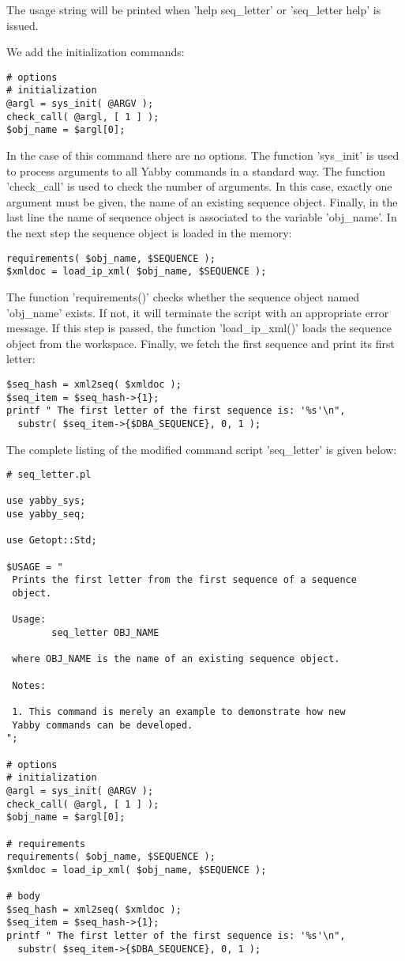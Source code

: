 The usage string will be printed when 'help seq\_letter' or
'seq\_letter help' is issued.

We add the initialization commands:

\begin{verbatim}
# options
# initialization
@argl = sys_init( @ARGV );
check_call( @argl, [ 1 ] );
$obj_name = $argl[0];
\end{verbatim}

In the case of this command there are no options. The function
'sys\_init' is used to process arguments to all Yabby commands
in a standard way. The function 'check\_call' is used to check
the number of arguments.  In this case, exactly one argument
must be given, the name of an existing sequence object.  Finally,
in the last line the name of sequence object is associated to
the variable 'obj\_name'. In the next step the sequence object
is loaded in the memory:
 
\begin{verbatim}
requirements( $obj_name, $SEQUENCE );
$xmldoc = load_ip_xml( $obj_name, $SEQUENCE );
\end{verbatim}

The function 'requirements()' checks whether the sequence object
named 'obj\_name' exists. If not, it will terminate the script
with an appropriate error message. If this step is passed, the
function 'load\_ip\_xml()' loads the sequence object from the
workspace. Finally, we fetch the first sequence and print its
first letter:

\begin{verbatim}
$seq_hash = xml2seq( $xmldoc );
$seq_item = $seq_hash->{1};
printf " The first letter of the first sequence is: '%s'\n",
  substr( $seq_item->{$DBA_SEQUENCE}, 0, 1 );
\end{verbatim}

The complete listing of the modified command script 'seq\_letter'
is given below: 

\begin{verbatim}
# seq_letter.pl

use yabby_sys;
use yabby_seq;

use Getopt::Std;

$USAGE = "
 Prints the first letter from the first sequence of a sequence
 object. 

 Usage:
        seq_letter OBJ_NAME

 where OBJ_NAME is the name of an existing sequence object.

 Notes:

 1. This command is merely an example to demonstrate how new
 Yabby commands can be developed.
";

# options
# initialization
@argl = sys_init( @ARGV );
check_call( @argl, [ 1 ] );
$obj_name = $argl[0];

# requirements
requirements( $obj_name, $SEQUENCE );
$xmldoc = load_ip_xml( $obj_name, $SEQUENCE );

# body
$seq_hash = xml2seq( $xmldoc );
$seq_item = $seq_hash->{1};
printf " The first letter of the first sequence is: '%s'\n",
  substr( $seq_item->{$DBA_SEQUENCE}, 0, 1 );
\end{verbatim}

